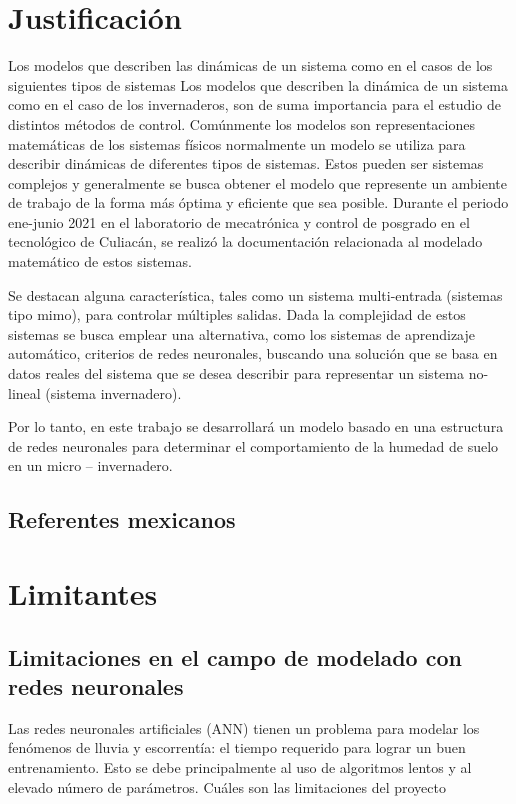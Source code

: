 \section{Justificación}
Los modelos que describen las dinámicas de un sistema como en el casos de los
siguientes tipos de sistemas Los modelos que describen la dinámica de un
sistema como en el caso de los invernaderos, son de suma importancia para el
estudio de distintos métodos de control. Comúnmente los modelos son
representaciones matemáticas de los sistemas físicos normalmente un modelo se
utiliza para describir dinámicas de diferentes tipos de sistemas. Estos pueden
ser sistemas complejos y generalmente se busca obtener el modelo que represente
un ambiente de trabajo de la forma más óptima y eficiente que sea posible.
Durante el periodo ene-junio 2021 en el laboratorio de mecatrónica y control de
posgrado en el tecnológico de Culiacán, se realizó la documentación relacionada
al modelado matemático de estos sistemas.



\par Se destacan alguna característica, tales como un sistema multi-entrada
(sistemas tipo mimo), para controlar múltiples salidas.  Dada la complejidad de
estos sistemas se busca emplear una alternativa, como los sistemas de
aprendizaje automático, criterios de redes neuronales, buscando una solución
que se basa en datos reales del sistema que se desea describir para representar
un sistema no-lineal (sistema invernadero).  

\par Por lo tanto, en este trabajo se desarrollará un modelo basado en una
estructura de redes neuronales para determinar el comportamiento de la humedad
de suelo en un micro – invernadero.

\subsection{Referentes mexicanos}
% 
\section{Limitantes}
\subsection{Limitaciones en el campo de modelado con redes neuronales}
Las redes neuronales artificiales (ANN) tienen un problema para modelar los
fenómenos de lluvia y escorrentía: el tiempo requerido para lograr un buen
entrenamiento. Esto se debe principalmente al uso de algoritmos lentos y al
elevado número de parámetros. \cite{brahm2003disminucion} Cuáles son las
limitaciones del proyecto\cite{1aa6ddcb00bd4d8692d2b66d981c534f} 
